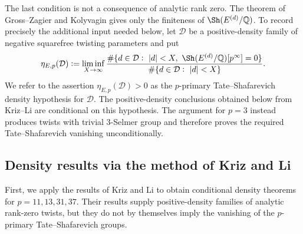 \documentclass[12pt]{amsart}
\newcommand{\Q}{\mathbb{Q}}
\numberwithin{equation}{section}
\begin{document}
The last condition is not a consequence of analytic rank zero. The theorem of Gross--Zagier and Kolyvagin gives only the finiteness of $\Sh(E^{(d)}/\Q)$. To record precisely the additional input needed below, let $\mathcal D$ be a positive-density family of negative squarefree twisting parameters and put
\[
\eta_{E,p}(\mathcal D):=
\liminf_{X\to\infty}
\frac{\#\{d\in\mathcal D:\ |d|<X,\ \Sh(E^{(d)}/\Q)[p^\infty]=0\}}
{\#\{d\in\mathcal D:\ |d|<X\}}.
\]
We refer to the assertion $\eta_{E,p}(\mathcal D)>0$ as the $p$-primary Tate--Shafarevich density hypothesis for $\mathcal D$. The positive-density conclusions obtained below from Kriz--Li are conditional on this hypothesis. The argument for $p=3$ instead produces twists with trivial $3$-Selmer group and therefore proves the required Tate--Shafarevich vanishing unconditionally.

\subsection{Density results via the method of Kriz and Li}

First, we apply the results of Kriz and Li \cite{kriz-li} to obtain conditional density theorems for $p=11,13,31,37$. Their results supply positive-density families of analytic rank-zero twists, but they do not by themselves imply the vanishing of the $p$-primary Tate--Shafarevich groups. 
\end{document}
